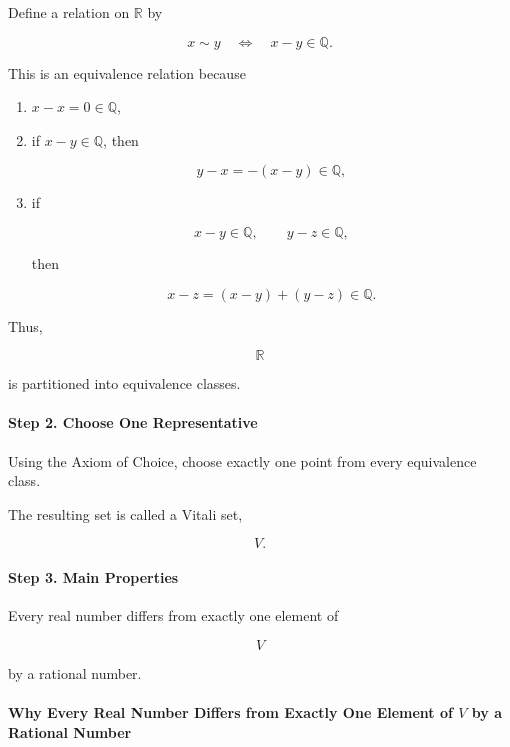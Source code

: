 \documentclass[11pt]{article}
\begin{document}
	Define a relation on $\mathbb R$ by
	
	\[
	x\sim y
	\quad
	\Longleftrightarrow
	\quad
	x-y\in\mathbb Q.
	\]
	
	This is an equivalence relation because
	
	\begin{enumerate}
		\item
		$x-x=0\in\mathbb Q$,
		
		\item
		if $x-y\in\mathbb Q$, then
		
		\[
		y-x=-(x-y)\in\mathbb Q,
		\]
		
		\item
		if
		
		\[
		x-y\in\mathbb Q,
		\qquad
		y-z\in\mathbb Q,
		\]
		
		then
		
		\[
		x-z=(x-y)+(y-z)\in\mathbb Q.
		\]
	\end{enumerate}
	
	Thus,
	
	\[
	\mathbb R
	\]
	
	is partitioned into equivalence classes.
	
	
	\paragraph{Step 2. Choose One Representative}
	
	Using the Axiom of Choice, choose exactly one point from every equivalence
	class.
	
	The resulting set is called a Vitali set,
	
	\[
	V.
	\]
	
	
	\paragraph{Step 3. Main Properties}
	
	Every real number differs from exactly one element of
	
	\[
	V
	\]
	
	by a rational number.
	
	\paragraph{Why Every Real Number Differs from Exactly One Element of \(V\) by a Rational Number}
	
\end{document}
